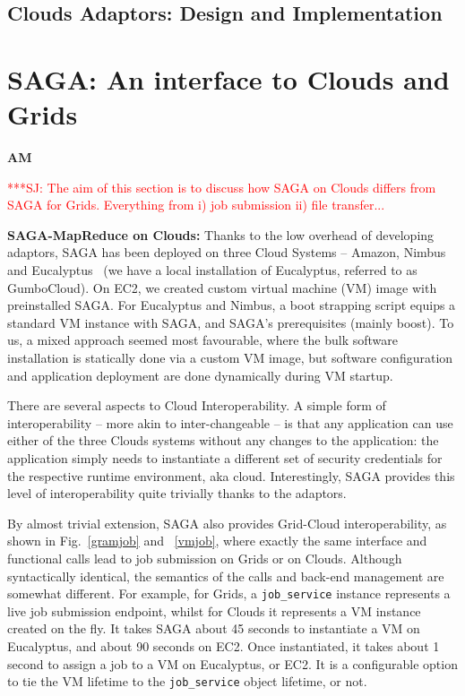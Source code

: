 \documentclass[conference,final]{IEEEtran}
\newcommand{\jhanote}[1]{ {\textcolor{red} { ***SJ: #1 }}}
\newcommand{\jhanote}[1]{}
\begin{document}
\subsection{Clouds Adaptors: Design and Implementation}



\section{SAGA: An interface to Clouds and Grids}{\bf AM}


\jhanote{The aim of this section is to discuss how SAGA on Clouds
  differs from SAGA for Grids. Everything from i) job submission ii)
  file transfer...}


{\bf SAGA-MapReduce on Clouds: } Thanks to the low overhead of
developing adaptors, SAGA has been deployed on three Cloud Systems --
Amazon, Nimbus~\cite{nimbus} and Eucalyptus~\cite{eucalyptus} (we have
a local installation of Eucalyptus, referred to as GumboCloud).  On
EC2, we created custom virtual machine (VM) image with preinstalled
SAGA.  For Eucalyptus and Nimbus, a boot strapping script equips a
standard VM instance with SAGA, and SAGA's prerequisites (mainly
boost).  To us, a mixed approach seemed most favourable, where the
bulk software installation is statically done via a custom VM image,
but software configuration and application deployment are done
dynamically during VM startup.

There are several aspects to Cloud Interoperability. A simple form of
interoperability -- more akin to inter-changeable -- is that any
application can use either of the three Clouds systems without any
changes to the application: the application simply needs to
instantiate a different set of security credentials for the respective
runtime environment, aka cloud.  Interestingly, SAGA provides this level of
interoperability quite trivially thanks to the adaptors.

By almost trivial extension, SAGA also provides Grid-Cloud
interoperability, as shown in Fig.~\ref{gramjob} and ~\ref{vmjob},
where exactly the same interface and functional calls lead to job
submission on Grids or on Clouds. Although syntactically identical,
the semantics of the calls and back-end management are somewhat
different.  For example, for Grids, a \texttt{job\_service} instance
represents a live job submission endpoint, whilst for Clouds it
represents a VM instance created on the fly.  It takes SAGA about 45
seconds to instantiate a VM on Eucalyptus, and about 90 seconds on
EC2. Once instantiated, it takes about 1 second to assign a job to a
VM on Eucalyptus, or EC2.  It is a configurable option to tie the VM
lifetime to the \texttt{job\_service} object lifetime, or not.
\end{document}
